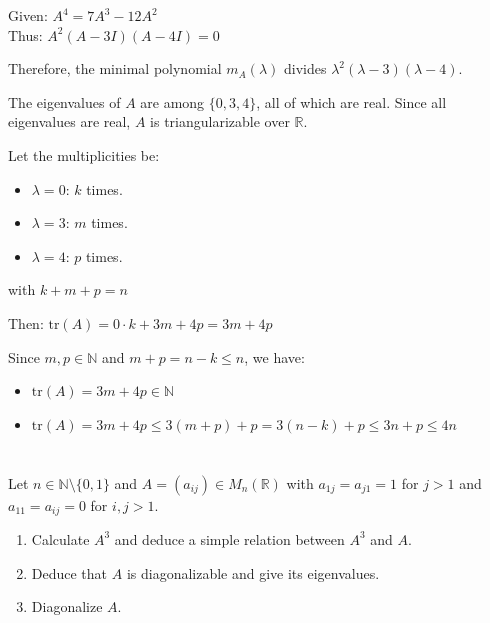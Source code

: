 \documentclass[12pt]{article}
\begin{document}
\begin{correctionbox}
Given: $A^4 = 7A^3 - 12A^2$ \\
Thus: $A^2(A-3I)(A-4I) = 0$

Therefore, the minimal polynomial $m_A(\lambda)$ divides $\lambda^2(\lambda-3)(\lambda-4)$.

The eigenvalues of $A$ are among $\{0, 3, 4\}$, all of which are real. Since all eigenvalues are real, $A$ is triangularizable over $\mathbb{R}$.

Let the multiplicities be:
\begin{itemize}
    \item $\lambda = 0$: $k$ times. 
    \item $\lambda = 3$: $m$ times. 
    \item $\lambda = 4$: $p$ times. 
\end{itemize}
with $k + m + p = n$

Then: $\text{tr}(A) = 0\cdot k + 3m + 4p = 3m + 4p$

Since $m, p \in \mathbb{N}$ and $m + p = n - k \le n$, we have:
\begin{itemize}
    \item $\text{tr}(A) = 3m + 4p \in \mathbb{N}$
    \item $\text{tr}(A) = 3m + 4p \le 3(m+p) + p = 3(n-k) + p \le 3n + p \le 4n$
\end{itemize}

\end{correctionbox}

\section{}
Let $n \in \mathbb{N}\setminus\{0,1\}$ and $A=(a_{ij}) \in M_{n}(\mathbb{R})$ with $a_{1j}=a_{j1}=1$ for $j>1$ and $a_{11}=a_{ij}=0$ for $i, j > 1$.
\begin{enumerate}
    \item Calculate $A^3$ and deduce a simple relation between $A^3$ and $A$.
    \item Deduce that $A$ is diagonalizable and give its eigenvalues.
    \item Diagonalize $A$.
\end{enumerate}
\end{document}
